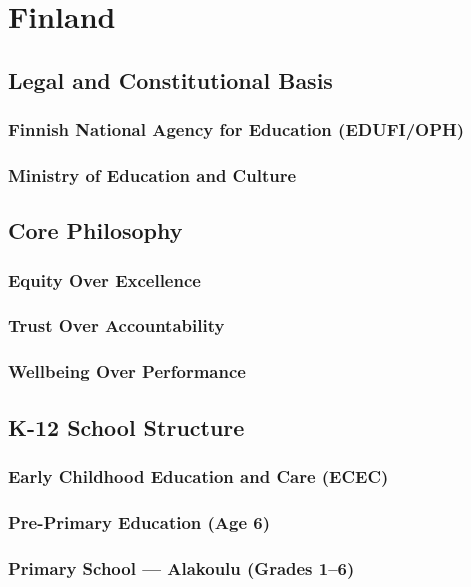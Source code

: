 \chapter{Finland}

\section{Legal and Constitutional Basis}
\subsection{Finnish National Agency for Education (EDUFI/OPH)}
\subsection{Ministry of Education and Culture}

\section{Core Philosophy}
\subsection{Equity Over Excellence}
\subsection{Trust Over Accountability}
\subsection{Wellbeing Over Performance}

\section{K-12 School Structure}
\subsection{Early Childhood Education and Care (ECEC)}
\subsection{Pre-Primary Education (Age 6)}
\subsection{Primary School --- Alakoulu (Grades 1--6)}
